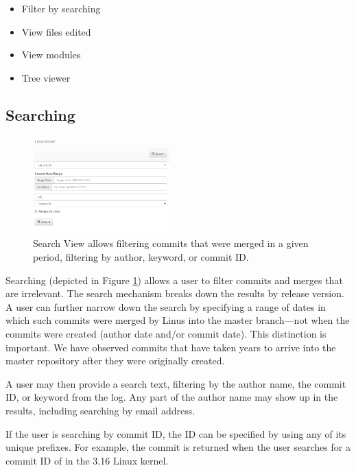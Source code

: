\documentclass[draft]{IEEEtran}
\begin{document}
\begin{itemize}
        \item Filter by searching
        \item View files edited
        \item View modules
        \item Tree viewer
\end{itemize}

\subsection{Searching}

\begin{figure}
        \centering
        \includegraphics[width=0.47\textwidth]{figures/search.png}
        \caption{Search View allows filtering commits that were merged in a given
                period, filtering by author, keyword, or commit ID.}
        \label{fig:search}
\end{figure}

Searching (depicted in Figure \ref{fig:search}) allows a user to filter
commits and merges that are irrelevant. The search mechanism breaks down
the results by release version. A user can further narrow down the
search by specifying a range of dates in which such commits were merged
by Linus into the master branch---not when the commits were created
(author date and/or commit date). This distinction is important. We have
observed commits that have taken years to arrive into the master
repository after they were originally created.

A user may then provide a search text, filtering by the author name, the
commit ID, or keyword from the log. Any part of the author name may show
up in the results, including searching by email address.

If the user is searching by commit ID, the ID can be specified by using
any of its unique prefixes. For example, the commit
 is returned when the
user searches for a commit ID of  in the 3.16 Linux
kernel.
\end{document}

